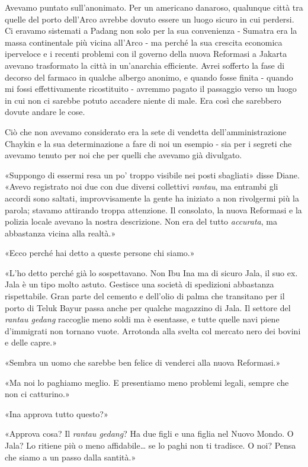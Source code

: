 Avevamo puntato sull'anonimato. Per un americano danaroso, qualunque
città tra quelle del porto dell'Arco avrebbe dovuto essere un luogo
sicuro in cui perdersi. Ci eravamo sistemati a Padang non solo per la
sua convenienza - Sumatra era la massa continentale più vicina all'Arco
- ma perché la sua crescita economica iperveloce e i recenti problemi
con il governo della nuova Reformasi a Jakarta avevano trasformato la
città in un'anarchia efficiente. Avrei sofferto la fase di decorso del
farmaco in qualche albergo anonimo, e quando fosse finita - quando mi
fossi effettivamente ricostituito - avremmo pagato il passaggio verso un
luogo in cui non ci sarebbe potuto accadere niente di male. Era così che
sarebbero dovute andare le cose.

Ciò che non avevamo considerato era la sete di vendetta
dell'amministrazione Chaykin e la sua determinazione a fare di noi un
esempio - sia per i segreti che avevamo tenuto per noi che per quelli
che avevamo già divulgato.

«Suppongo di essermi resa un po' troppo visibile nei posti sbagliati»
disse Diane. «Avevo registrato noi due con due diversi collettivi
\emph{rantau}, ma entrambi gli accordi sono saltati, improvvisamente la
gente ha iniziato a non rivolgermi più la parola; stavamo attirando
troppa attenzione. Il consolato, la nuova Reformasi e la polizia locale
avevano la nostra descrizione. Non era del tutto \emph{accurata}, ma
abbastanza vicina alla realtà.»

«Ecco perché hai detto a queste persone chi siamo.»

«L'ho detto perché già lo sospettavano. Non Ibu Ina ma di sicuro Jala,
il suo ex. Jala è un tipo molto astuto. Gestisce una società di
spedizioni abbastanza rispettabile. Gran parte del cemento e dell'olio
di palma che transitano per il porto di Teluk Bayur passa anche per
qualche magazzino di Jala. Il settore del \emph{rantau gedang} raccoglie
meno soldi ma è esentasse, e tutte quelle navi piene d'immigrati non
tornano vuote. Arrotonda alla svelta col mercato nero dei bovini e delle
capre.»

«Sembra un uomo che sarebbe ben felice di venderci alla nuova
Reformasi.»

«Ma noi lo paghiamo meglio. E presentiamo meno problemi legali, sempre
che non ci catturino.»

«Ina approva tutto questo?»

«Approva cosa? Il \emph{rantau gedang}? Ha due figli e una figlia nel
Nuovo Mondo. O Jala? Lo ritiene più o meno affidabile\ldots{} se lo
paghi non ti tradisce. O noi? Pensa che siamo a un passo dalla santità.»

